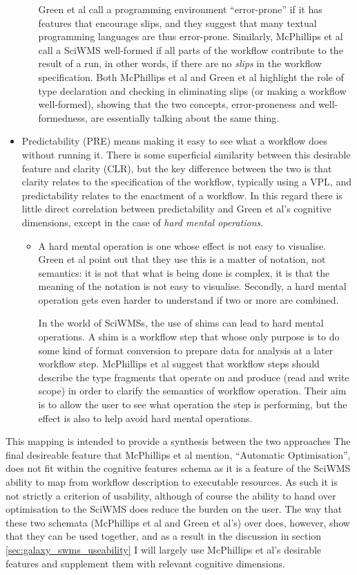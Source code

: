 \documentclass[a4paper,10pt]{scrreprt} \usepackage[utf8]{inputenc}
\begin{document}
\begin{itemize}
\begin{itemize}
Green et al call a programming environment ``error-prone'' if it has features that encourage slips, and they suggest that many textual programming languages are thus error-prone. Similarly, McPhillips et al call a \gls{SciWMS} well-formed if all parts of the \gls{workflow} contribute to the result of a run, in other words, if there are no \emph{slips} in the workflow specification. Both McPhillips et al and Green et al highlight the role of type declaration and checking in eliminating slips (or making a workflow well-formed), showing that the two concepts, error-proneness and well-formedness, are essentially talking about the same thing.
\end{itemize}
\item Predictability (PRE) means making it easy to see what a workflow does without running it. There is some superficial similarity between this desirable feature and clarity (CLR), but the key difference between the two is that clarity relates to the specification of the \gls{workflow}, typically using a \gls{VPL}, and predictability relates to the enactment of a \gls{workflow}. In this regard there is little direct correlation between predictability and Green et al's cognitive dimensions, except in the case of \emph{hard mental operations}.
\begin{itemize}
\item A hard mental operation is one whose effect is not easy to visualise. Green et al point out that they use this is a matter of notation, not semantics: it is not that what is being done is complex, it is that the meaning of the notation is not easy to visualise. Secondly, a hard mental operation gets even harder to understand if two or more are combined.

In the world of \glspl{SciWMS}, the use of shims can lead to hard mental operations. A shim is a \gls{workflow} step that whose only purpose is to do some kind of format conversion to prepare data for analysis at a later \gls{workflow} step. McPhillips et al suggest that \gls{workflow} steps should describe the type fragments that operate on and produce (read and write scope) in order to clarify the semantics of \gls{workflow} operation. Their aim is to allow the user to see what operation the step is performing, but the effect is also to help avoid hard mental operations.
\end{itemize}
\end{itemize}

This mapping is intended to provide a synthesis between the two approaches The final desireable feature that McPhillips et al mention, ``Automatic Optimisation'', does not fit within the cognitive features schema as it is a feature of the \gls{SciWMS} ability to map from \gls{workflow} description to executable resources. As such it is not strictly a criterion of usability, although of course the ability to hand over optimisation to the \gls{SciWMS} does reduce the burden on the user. The way that these two schemata (McPhillips et al and Green et al's) over does, however, show that they can be used together, and as a result in the discussion in section \ref{sec:galaxy_swms_useability} I will largely use McPhillips et al's desirable features and supplement them with relevant cognitive dimensions.
\end{document}
